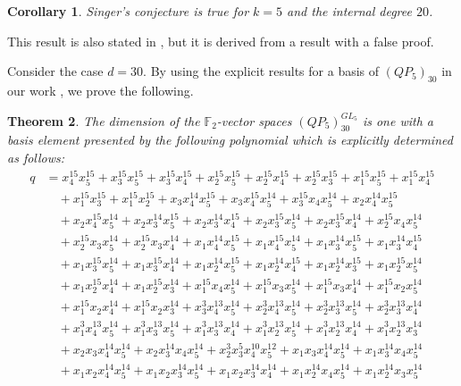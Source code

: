 \documentclass[reqno]{amsart}
\theoremstyle{plain}
\newtheorem{thm}{Theorem}[section]
\newtheorem{corl}[thm]{Corollary}
\theoremstyle{definition}
\theoremstyle{plain}
\theoremstyle{definition}
\numberwithin{equation}{section}
\begin{document}
\begin{corl}\label{pthm1} Singer's conjecture is true for $k=5$ and the internal degree $20$.
\end{corl}
This result is also stated in \cite[Corollary 1.7]{p24}, but it is derived from a result with a false proof.

Consider the case $d = 30$. By using the explicit results for a basis of $(QP_5)_{30}$ in our work \cite{smo}, we prove the following. 
\begin{thm}\label{thm2} 
The dimension of the $\mathbb F_2$-vector spaces $(QP_5)_{30}^{GL_5}$ is one with a basis element presented by the following polynomial which is explicitly determined as follows: 
\begin{align*}
q &= x_4^{15}x_5^{15} + x_3^{15}x_5^{15} + x_3^{15}x_4^{15} + x_2^{15}x_5^{15} + x_2^{15}x_4^{15} + x_2^{15}x_3^{15} + x_1^{15}x_5^{15} + x_1^{15}x_4^{15}\\ 
&\quad + x_1^{15}x_3^{15} + x_1^{15}x_2^{15} + x_3x_4^{14}x_5^{15} + x_3x_4^{15}x_5^{14} + x_3^{15}x_4x_5^{14} + x_2x_4^{14}x_5^{15}\\ 
&\quad + x_2x_4^{15}x_5^{14} + x_2x_3^{14}x_5^{15} + x_2x_3^{14}x_4^{15} + x_2x_3^{15}x_5^{14} + x_2x_3^{15}x_4^{14} + x_2^{15}x_4x_5^{14}\\ 
&\quad + x_2^{15}x_3x_5^{14} + x_2^{15}x_3x_4^{14} + x_1x_4^{14}x_5^{15} + x_1x_4^{15}x_5^{14} + x_1x_3^{14}x_5^{15} + x_1x_3^{14}x_4^{15}\\ 
&\quad + x_1x_3^{15}x_5^{14} + x_1x_3^{15}x_4^{14} + x_1x_2^{14}x_5^{15} + x_1x_2^{14}x_4^{15} + x_1x_2^{14}x_3^{15} + x_1x_2^{15}x_5^{14}\\ 
&\quad + x_1x_2^{15}x_4^{14} + x_1x_2^{15}x_3^{14} + x_1^{15}x_4x_5^{14} + x_1^{15}x_3x_5^{14} + x_1^{15}x_3x_4^{14} + x_1^{15}x_2x_5^{14}\\ 
&\quad + x_1^{15}x_2x_4^{14} + x_1^{15}x_2x_3^{14} + x_3^{3}x_4^{13}x_5^{14} + x_2^{3}x_4^{13}x_5^{14} + x_2^{3}x_3^{13}x_5^{14} + x_2^{3}x_3^{13}x_4^{14}\\ 
&\quad + x_1^{3}x_4^{13}x_5^{14} + x_1^{3}x_3^{13}x_5^{14} + x_1^{3}x_3^{13}x_4^{14} + x_1^{3}x_2^{13}x_5^{14} + x_1^{3}x_2^{13}x_4^{14} + x_1^{3}x_2^{13}x_3^{14}\\ 
&\quad + x_2x_3x_4^{14}x_5^{14} + x_2x_3^{14}x_4x_5^{14} + x_2^{3}x_3^{5}x_4^{10}x_5^{12} + x_1x_3x_4^{14}x_5^{14} + x_1x_3^{14}x_4x_5^{14}\\ 
&\quad + x_1x_2x_4^{14}x_5^{14} + x_1x_2x_3^{14}x_5^{14} + x_1x_2x_3^{14}x_4^{14} + x_1x_2^{14}x_4x_5^{14} + x_1x_2^{14}x_3x_5^{14}\\ 

\end{align*}
\end{thm}
\end{document}
